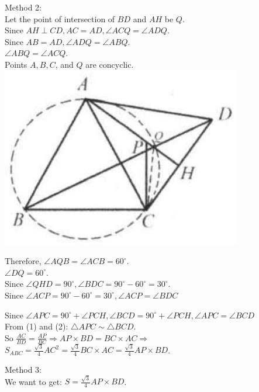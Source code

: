 \documentclass[10pt]{article}
\begin{document}
Method 2:\\
Let the point of intersection of \(B D\) and \(A H\) be \(Q\).\\
Since \(A H \perp C D, A C=A D, \angle A C Q=\angle A D Q\).\\
Since \(A B=A D, \angle A D Q=\angle A B Q\).\\
\(\angle A B Q=\angle A C Q\).\\
Points \(A, B, C\), and \(Q\) are concyclic.\\
\includegraphics[max width=\textwidth, center]{2025_04_17_97bc1f7e44d93c271a88g-198}

Therefore, \(\angle A Q B=\angle A C B=60^{\circ}\).\\
\(\angle D Q=60^{\circ}\).\\
Since \(\angle Q H D=90^{\circ}, \angle B D C=90^{\circ}-60^{\circ}=30^{\circ}\).\\
Since \(\angle A C P=90^{\circ}-60^{\circ}=30^{\circ}, \angle A C P=\angle B D C\)

Since \(\angle A P C=90^{\circ}+\angle P C H, \angle B C D=90^{\circ}+\angle P C H, \angle A P C=\angle B C D\)\\
From (1) and (2): \(\triangle A P C \sim \triangle B C D\).\\
So \(\frac{A C}{B D}=\frac{A P}{B C} \Rightarrow A P \times B D=B C \times A C \Rightarrow\)\\
\(S_{A B C}=\frac{\sqrt{3}}{4} A C^{2}=\frac{\sqrt{3}}{4} B C \times A C=\frac{\sqrt{3}}{4} A P \times B D\).

Method 3:\\
We want to get: \(S=\frac{\sqrt{3}}{4} A P \times B D\).
\end{document}
